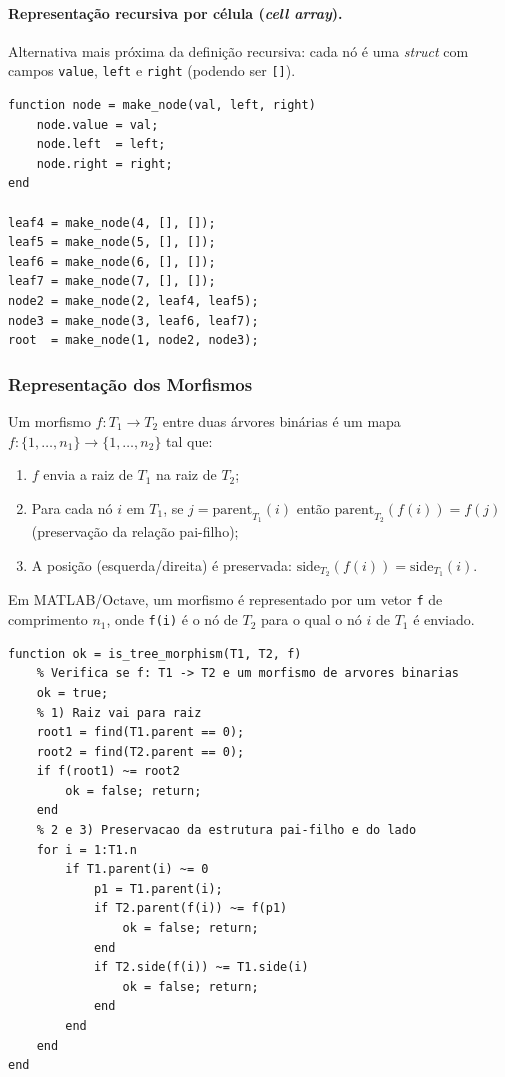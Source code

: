 \paragraph{Representação recursiva por célula (\textit{cell array}).}
Alternativa mais próxima da definição recursiva: cada nó é uma \textit{struct} com campos \texttt{value}, \texttt{left} e \texttt{right} (podendo ser \texttt{[]}).

\begin{lstlisting}[style=matlab, caption={Representação recursiva de uma árvore binária}]
function node = make_node(val, left, right)
    node.value = val;
    node.left  = left;
    node.right = right;
end

leaf4 = make_node(4, [], []);
leaf5 = make_node(5, [], []);
leaf6 = make_node(6, [], []);
leaf7 = make_node(7, [], []);
node2 = make_node(2, leaf4, leaf5);
node3 = make_node(3, leaf6, leaf7);
root  = make_node(1, node2, node3);
\end{lstlisting}

\subsubsection{Representação dos Morfismos}

\begin{definition}
Um morfismo $f: T_1 \to T_2$ entre duas árvores binárias é um mapa $f: \{1,\ldots,n_1\} \to \{1,\ldots,n_2\}$ tal que:
\begin{enumerate}
    \item $f$ envia a raiz de $T_1$ na raiz de $T_2$;
    \item Para cada nó $i$ em $T_1$, se $j = \mathrm{parent}_{T_1}(i)$ então $\mathrm{parent}_{T_2}(f(i)) = f(j)$ (preservação da relação pai-filho);
    \item A posição (esquerda/direita) é preservada: $\mathrm{side}_{T_2}(f(i)) = \mathrm{side}_{T_1}(i)$.
\end{enumerate}
\end{definition}

Em MATLAB/Octave, um morfismo é representado por um vetor \texttt{f} de comprimento $n_1$, onde \texttt{f(i)} é o nó de $T_2$ para o qual o nó $i$ de $T_1$ é enviado.

\begin{lstlisting}[style=matlab, caption={Verificação de um morfismo de árvores binárias}]
function ok = is_tree_morphism(T1, T2, f)
    % Verifica se f: T1 -> T2 e um morfismo de arvores binarias
    ok = true;
    % 1) Raiz vai para raiz
    root1 = find(T1.parent == 0);
    root2 = find(T2.parent == 0);
    if f(root1) ~= root2
        ok = false; return;
    end
    % 2 e 3) Preservacao da estrutura pai-filho e do lado
    for i = 1:T1.n
        if T1.parent(i) ~= 0
            p1 = T1.parent(i);
            if T2.parent(f(i)) ~= f(p1)
                ok = false; return;
            end
            if T2.side(f(i)) ~= T1.side(i)
                ok = false; return;
            end
        end
    end
end
\end{lstlisting}
